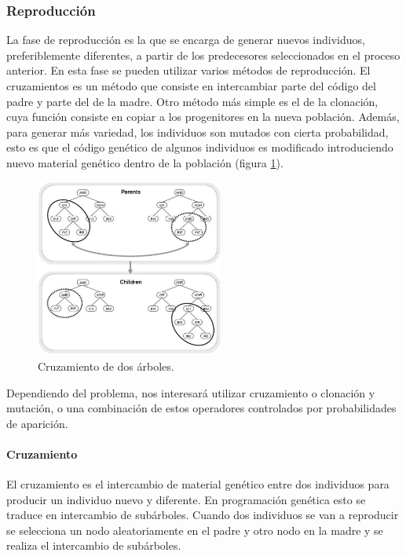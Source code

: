 \subsubsection{Reproducción}

La fase de reproducción es la que se encarga de generar nuevos individuos,
preferiblemente diferentes, a partir de los predecesores seleccionados en el
proceso anterior. En esta fase se pueden utilizar varios métodos de reproducción.
El cruzamientos es un método que consiste en intercambiar parte del código del
padre y parte del de la madre. Otro método más simple es el de la clonación, cuya
función consiste en copiar a los progenitores en la nueva población. Además, para
generar más variedad, los individuos son mutados con cierta probabilidad, esto es
que el código genético de algunos individuos es modificado introduciendo nuevo
material genético dentro de la población (figura \ref{fig:cross}).

\begin{figure}[t]
\centering
\includegraphics[width=0.55\textwidth]{figs/cross}
\caption{Cruzamiento de dos árboles.}
\label{fig:cross}
\end{figure}

Dependiendo del problema, nos interesará utilizar cruzamiento o clonación y mutación, o una combinación de estos
operadores controlados por probabilidades de aparición.
 
\paragraph{Cruzamiento}\label{para:crossover}

El cruzamiento es el intercambio de material genético entre dos individuos para producir un individuo nuevo y
diferente. En programación genética esto se traduce en intercambio de subárboles. Cuando dos individuos se van a
reproducir se selecciona un nodo aleatoriamente en el padre y otro nodo en la madre y se realiza el intercambio
de subárboles.

